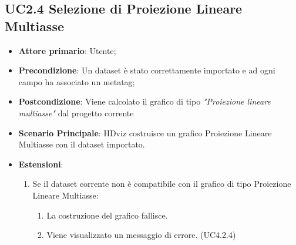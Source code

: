 \subsection{UC2.4 Selezione di Proiezione Lineare Multiasse}
\label{ssub:UC2.4}
\begin{itemize}

    \item \textbf{Attore primario}: Utente;

    \item \textbf{Precondizione}:   Un dataset è stato correttamente importato e ad ogni campo ha associato
                                    un metatag;

    \item \textbf{Postcondizione}:  Viene calcolato il grafico di tipo \emph{"Proiezione lineare multiasse"} dal progetto corrente

	\item \textbf{Scenario Principale}: HDviz costruisce un grafico Proiezione Lineare Multiasse con il dataset importato.
	\item \textbf{Estensioni}:
	\begin{enumerate}
		\item Se il dataset corrente non è compatibile con il grafico di tipo Proiezione Lineare Multiasse:
		\begin{enumerate}
			\item La costruzione del grafico fallisce.
			\item Viene visualizzato un messaggio di errore. (UC4.2.4)
		\end{enumerate}
	\end{enumerate}
\end{itemize}


